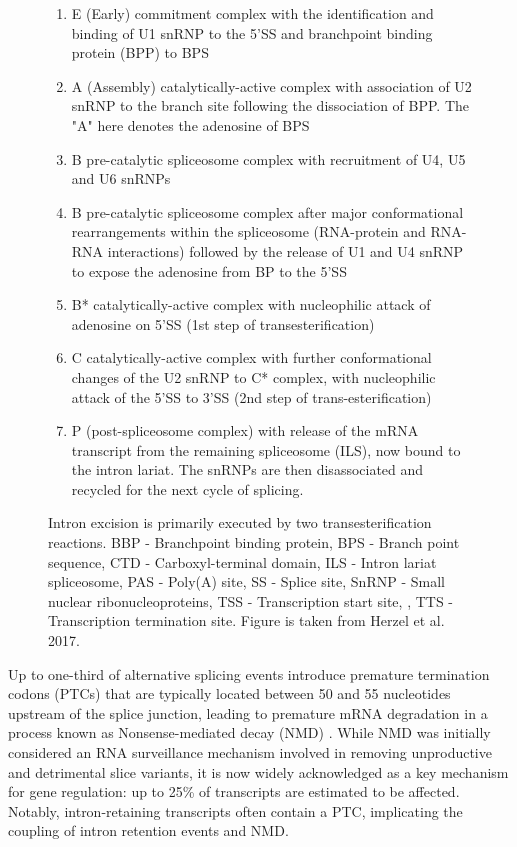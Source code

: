 \begin{figure}[!htp]
{\begin{enumerate}
			\item E (Early) commitment complex with the identification and binding of U1 snRNP to the 5'SS and branchpoint binding protein (BPP) to BPS 
			\item A (Assembly) catalytically-active complex with association of U2 snRNP to the branch site following the dissociation of BPP. The "A" here denotes the adenosine of BPS
			\item B pre-catalytic spliceosome complex with recruitment of U4, U5 and U6 snRNPs
			\item B pre-catalytic spliceosome complex after major conformational rearrangements within the spliceosome (RNA-protein and RNA-RNA interactions) followed by the release of U1 and U4 snRNP to expose the adenosine from BP to the 5'SS 
			\item B* catalytically-active complex with nucleophilic attack of adenosine on 5'SS (1st step of transesterification) 
			\item C catalytically-active complex with further conformational changes of the U2 snRNP to C* complex, with nucleophilic attack of the 5'SS to 3'SS (2nd step of trans-esterification) 
			\item P (post-spliceosome complex) with release of the mRNA transcript from the remaining spliceosome (ILS), now bound to the intron lariat. The snRNPs are then disassociated and recycled for the next cycle of splicing.
			\\
		\end{enumerate} 
		Intron excision is primarily executed by two transesterification reactions. BBP - Branchpoint binding protein, BPS - Branch point sequence, CTD - Carboxyl-terminal domain, ILS - Intron lariat spliceosome, PAS - Poly(A) site, SS - Splice site, SnRNP - Small nuclear ribonucleoproteins, TSS - Transcription start site, , TTS - Transcription termination site. Figure is taken from Herzel et al. 2017\cite{Herzel2017}.
	}
	\label{fig:AS_mechanism}
\end{figure}

\newpage
{}
Up to one-third of alternative splicing events introduce premature termination codons (PTCs) that are typically located between 50 and 55 nucleotides upstream of the splice junction, leading to premature mRNA degradation in a process known as Nonsense-mediated decay (NMD)\cite{Lewis2003} . While NMD was initially considered an RNA surveillance mechanism involved in removing unproductive and detrimental slice variants, it is now widely acknowledged as a key mechanism for gene regulation\cite{Nickless2017}: up to 25\% of transcripts are estimated to be affected\cite{Weischenfeldt2012}. Notably, intron-retaining transcripts often contain a PTC, implicating the coupling of intron retention events and NMD\cite{Wong2013}.     

